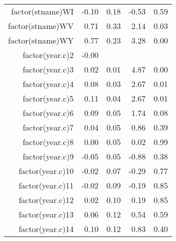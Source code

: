 \begin{table}[ht]
\begin{tabular}{rrrrr}
  factor(stname)WI & -0.10 & 0.18 & -0.53 & 0.59 \\ 
  factor(stname)WV & 0.71 & 0.33 & 2.14 & 0.03 \\ 
  factor(stname)WY & 0.77 & 0.23 & 3.28 & 0.00 \\ 
  factor(year.c)2 & -0.00 &  &  &  \\ 
  factor(year.c)3 & 0.02 & 0.01 & 4.87 & 0.00 \\ 
  factor(year.c)4 & 0.08 & 0.03 & 2.67 & 0.01 \\ 
  factor(year.c)5 & 0.11 & 0.04 & 2.67 & 0.01 \\ 
  factor(year.c)6 & 0.09 & 0.05 & 1.74 & 0.08 \\ 
  factor(year.c)7 & 0.04 & 0.05 & 0.86 & 0.39 \\ 
  factor(year.c)8 & 0.00 & 0.05 & 0.02 & 0.99 \\ 
  factor(year.c)9 & -0.05 & 0.05 & -0.88 & 0.38 \\ 
  factor(year.c)10 & -0.02 & 0.07 & -0.29 & 0.77 \\ 
  factor(year.c)11 & -0.02 & 0.09 & -0.19 & 0.85 \\ 
  factor(year.c)12 & 0.02 & 0.10 & 0.19 & 0.85 \\ 
  factor(year.c)13 & 0.06 & 0.12 & 0.54 & 0.59 \\ 
  factor(year.c)14 & 0.10 & 0.12 & 0.83 & 0.40 \\ 
   \hline
\end{tabular}
\end{table}
